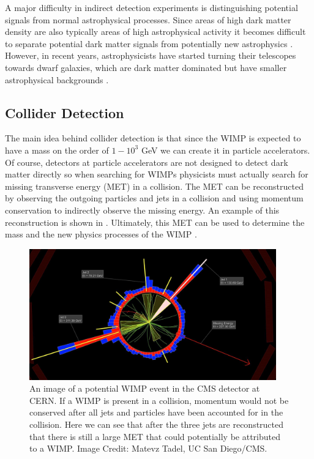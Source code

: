 A major difficulty in indirect detection experiments is distinguishing potential signals from normal astrophysical processes.  Since areas of high dark matter density are also typically areas of high astrophysical activity it becomes difficult to separate potential dark matter signals from potentially new astrophysics \cite{zitzer2015search}.  However, in recent years, astrophysicists have started turning their telescopes towards dwarf galaxies, which are dark matter dominated but have smaller astrophysical backgrounds \cite{conrad2014indirect}.  %



\subsection{Collider Detection}

The main idea behind collider detection is that since the WIMP is expected to have a mass on the order of $1-10^3$ GeV we can create it in particle accelerators.  Of course, detectors at particle accelerators are not designed to detect dark matter directly so when searching for WIMPs physicists must actually search for missing transverse energy (MET) in a collision.  The MET can be reconstructed by observing the outgoing particles and jets in a collision and using momentum conservation to indirectly observe the missing energy.  An example of this reconstruction is shown in .  Ultimately, this MET can be used to determine the mass and the new physics processes of the WIMP \cite{bi2013status}.

\begin{figure}[b]
	\centering
	\includegraphics[width=0.95\textwidth]{collider_detection_cms}
	\caption{An image of a potential WIMP event in the CMS detector at CERN.  If a WIMP is present in a collision, momentum would not be conserved after all jets and particles have been accounted for in the collision.  Here we can see that after the three jets are reconstructed that there is still a large MET that could potentially be attributed to a WIMP.  Image Credit: Matevz Tadel, UC San Diego/CMS.}
	\label{fig:collider_detection}
\end{figure}

